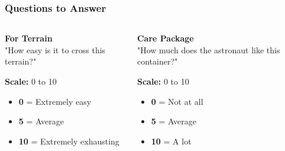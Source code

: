 \documentclass{beamer}
\begin{document}
\begin{frame}
\frametitle{Questions to Answer}
\begin{columns}
\begin{column}{0.5\textwidth}
\textbf{For Terrain}\\
"How easy is it to cross this terrain?"

\vspace{0.3cm}
\textbf{Scale:} 0 to 10
\begin{itemize}
    \item \textbf{0} = Extremely easy
    \item \textbf{5} = Average  
    \item \textbf{10} = Extremely exhausting
\end{itemize}
\end{column}
\begin{column}{0.5\textwidth}
\textbf{Care Package}\\
"How much does the astronaut like this container?"

\vspace{0.3cm}
\textbf{Scale:} 0 to 10
\begin{itemize}
    \item \textbf{0} = Not at all
    \item \textbf{5} = Average
    \item \textbf{10} = A lot
\end{itemize}
\end{column}
\end{columns}
\end{frame}
\end{document}
